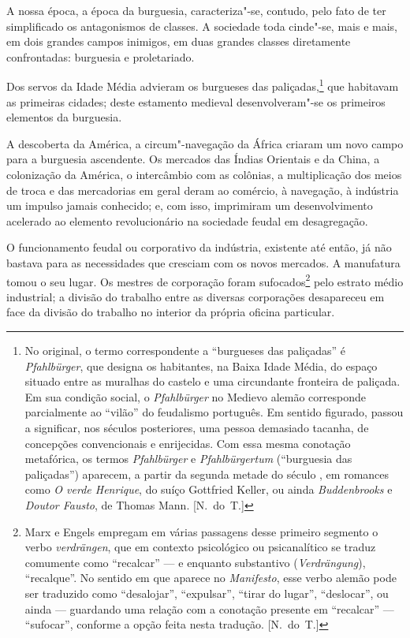 A nossa época, a época da burguesia, caracteriza"-se, contudo, pelo
fato de ter simplificado os antagonismos de classes. A sociedade toda
cinde"-se, mais e mais, em dois grandes campos inimigos, em duas			\label{1}
grandes classes diretamente confrontadas: burguesia e proletariado.

Dos servos da Idade Média advieram os burgueses das   
paliçadas,\footnote{ No original, o termo correspondente a “burgueses das paliçadas” é\label{8}
\textit{Pfahlbürger}, que designa os habitantes, na Baixa Idade Média,
do espaço situado entre as muralhas do castelo e uma circundante
fronteira de paliçada. Em sua condição social, o \textit{Pfahlbürger}
no Medievo alemão corresponde parcialmente ao “vilão” do feudalismo
português. Em sentido figurado, passou a significar, nos séculos
posteriores, uma pessoa demasiado tacanha, de concepções convencionais
e enrijecidas. Com essa mesma conotação metafórica, os termos
\textit{Pfahlbürger} e \textit{Pfahlbürgertum} (“burguesia das
paliçadas”) aparecem, a partir da segunda metade do século , em
romances como \textit{O verde Henrique}, do suíço Gottfried Keller, ou
ainda \textit{Buddenbrooks} e \textit{Doutor Fausto}, de Thomas
Mann. [N.~do~T.]}
que habitavam as primeiras cidades; deste estamento medieval 
desenvolveram"-se os primeiros elementos da burguesia.

A descoberta da América, a circum"-navegação da África criaram um novo
campo para a burguesia ascendente. Os mercados das Índias Orientais e
da China, a colonização da América, o intercâmbio com as colônias, a
multiplicação dos meios de troca e das mercadorias em geral deram ao
comércio, à navegação, à indústria um impulso jamais conhecido; e, com
isso, imprimiram um desenvolvimento acelerado ao elemento
revolucionário na sociedade feudal em desagregação.

O funcionamento feudal ou corporativo da indústria, existente
até então, já não bastava para as necessidades que cresciam com os
novos mercados. A manufatura tomou o seu lugar. Os mestres de
corporação foram sufocados\footnote{ Marx e Engels empregam em várias passagens 
desse primeiro segmento o verbo \textit{verdrängen}, que em contexto psicológico 
ou psicanalítico se traduz comumente como ``recalcar''  ---  e enquanto
substantivo (\textit{Verdrängung}), ``recalque''. No sentido em que aparece 
no \textit{Manifesto}, esse verbo alemão pode ser traduzido como
``desalojar'', ``expulsar'', ``tirar do lugar'', ``deslocar'',  ou ainda  --- 
guardando uma relação com a conotação presente em ``recalcar''  --- 
``sufocar'', conforme a opção feita nesta tradução. [N.~do~T.]}
pelo estrato médio industrial; a divisão do trabalho entre as
diversas corporações desapareceu em face da divisão do trabalho no
interior da própria oficina particular.

